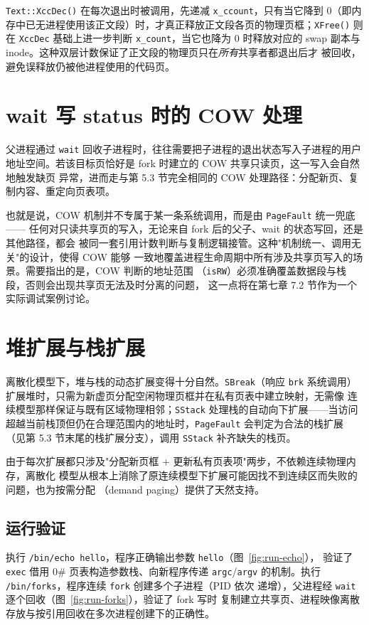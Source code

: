 \texttt{Text::XccDec()} 在每次退出时被调用，先递减 \texttt{x\_ccount}，只有当它降到
0（即内存中已无进程使用该正文段）时，才真正释放正文段各页的物理页框；\texttt{XFree()}
则在 \texttt{XccDec} 基础上进一步判断 \texttt{x\_count}，当它也降为 0 时释放对应的
swap 副本与 inode。这种双层计数保证了正文段的物理页只在\emph{所有}共享者都退出后才
被回收，避免误释放仍被他进程使用的代码页。

\section{wait 写 status 时的 COW 处理}
父进程通过 \texttt{wait} 回收子进程时，往往需要把子进程的退出状态写入子进程的用户
地址空间。若该目标页恰好是 fork 时建立的 COW 共享只读页，这一写入会自然地触发缺页
异常，进而走与第 5.3 节完全相同的 COW 处理路径：分配新页、复制内容、重定向页表项。

也就是说，COW 机制并不专属于某一条系统调用，而是由 \texttt{PageFault} 统一兜底——
任何对只读共享页的写入，无论来自 fork 后的父子、wait 的状态写回，还是其他路径，都会
被同一套引用计数判断与复制逻辑接管。这种"机制统一、调用无关"的设计，使得 COW 能够
一致地覆盖进程生命周期中所有涉及共享页写入的场景。需要指出的是，COW 判断的地址范围
（\texttt{isRW}）必须准确覆盖数据段与栈段，否则会出现共享页无法及时分离的问题，
这一点将在第七章 7.2 节作为一个实际调试案例讨论。

\section{堆扩展与栈扩展}
离散化模型下，堆与栈的动态扩展变得十分自然。\texttt{SBreak}（响应 \texttt{brk}
系统调用）扩展堆时，只需为新虚页分配空闲物理页框并在私有页表中建立映射，无需像
连续模型那样保证与既有区域物理相邻；\texttt{SStack} 处理栈的自动向下扩展——当访问
超越当前栈顶但仍在合理范围内的地址时，\texttt{PageFault} 会判定为合法的栈扩展
（见第 5.3 节末尾的栈扩展分支），调用 \texttt{SStack} 补齐缺失的栈页。

由于每次扩展都只涉及"分配新页框 + 更新私有页表项"两步，不依赖连续物理内存，离散化
模型从根本上消除了原连续模型下扩展可能因找不到连续区而失败的问题，也为按需分配
（demand paging）提供了天然支持。

\subsection*{运行验证}
执行 \texttt{/bin/echo hello}，程序正确输出参数 \texttt{hello}（图~\ref{fig:run-echo}），
验证了 \texttt{exec} 借用 0\# 页表构造参数栈、向新程序传递 \texttt{argc}/\texttt{argv}
的机制。执行 \texttt{/bin/forks}，程序连续 \texttt{fork} 创建多个子进程（PID 依次
递增），父进程经 \texttt{wait} 逐个回收（图~\ref{fig:run-forks}），验证了 fork 写时
复制建立共享页、进程映像离散存放与按引用回收在多次进程创建下的正确性。

